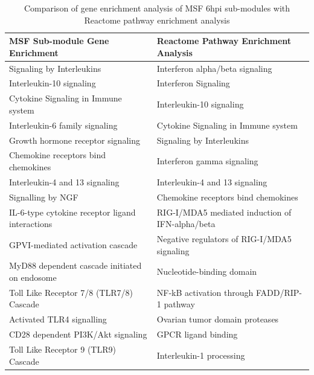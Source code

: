 \documentclass[twocolumn]{article}
\begin{document}
\begin{table}[]
	\centering
	\caption{Comparison of gene enrichment analysis of MSF 6hpi sub-modules with Reactome pathway enrichment analysis}
	\label{my-label}
	\begin{tabular}{|l|l|}
		\hline
		\textbf{MSF Sub-module Gene Enrichment}          & \textbf{Reactome Pathway Enrichment Analysis}   \\ \hline
		Signaling by Interleukins                        & Interferon alpha/beta signaling                 \\ \hline
		Interleukin-10 signaling                         & Interferon Signaling                            \\ \hline
		Cytokine Signaling in Immune system              & Interleukin-10 signaling                        \\ \hline
		Interleukin-6 family signaling                   & Cytokine Signaling in Immune system             \\ \hline
		Growth hormone receptor signaling                & Signaling by Interleukins                       \\ \hline
		Chemokine receptors bind chemokines              & Interferon gamma signaling                      \\ \hline
		Interleukin-4 and 13 signaling                   & Interleukin-4 and 13 signaling                  \\ \hline
		Signalling by NGF                                & Chemokine receptors bind chemokines             \\ \hline
		IL-6-type cytokine receptor ligand interactions  & RIG-I/MDA5 mediated induction of IFN-alpha/beta \\ \hline
		GPVI-mediated activation cascade                 & Negative regulators of RIG-I/MDA5 signaling     \\ \hline
		MyD88 dependent cascade initiated on endosome    & Nucleotide-binding domain                       \\ \hline
		Toll Like Receptor 7/8 (TLR7/8) Cascade          & NF-kB activation through FADD/RIP-1 pathway     \\ \hline
		Activated TLR4 signalling                        & Ovarian tumor domain proteases                  \\ \hline
		CD28 dependent PI3K/Akt signaling                & GPCR ligand binding                             \\ \hline
		Toll Like Receptor 9 (TLR9) Cascade              & Interleukin-1 processing                        \\ \hline

\end{tabular}
\end{table}
\end{document}
